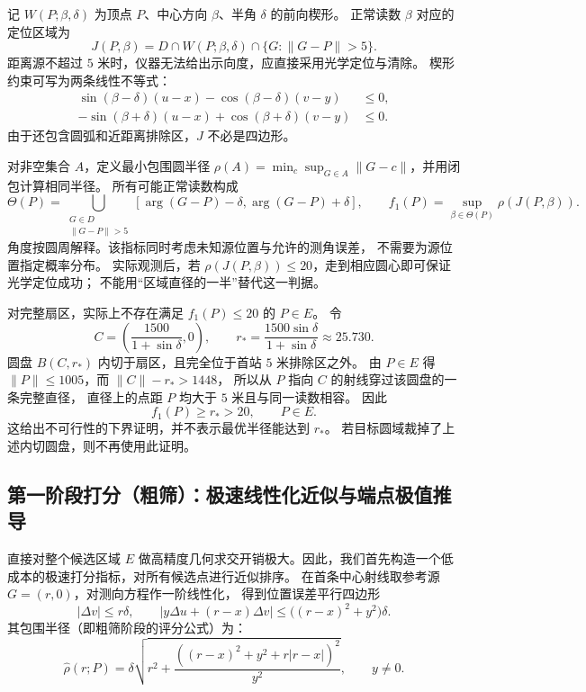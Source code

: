 记 $W(P;\beta,\delta)$ 为顶点 $P$、中心方向 $\beta$、半角 $\delta$ 的前向楔形。
正常读数 $\beta$ 对应的定位区域为
\begin{equation}
J(P,\beta)=D\cap W(P;\beta,\delta)\cap\{G:\|G-P\|>5\}.
\label{eq:q2J}
\end{equation}
距离源不超过 $5$ 米时，仪器无法给出示向度，应直接采用光学定位与清除。
楔形约束可写为两条线性不等式：
\begin{align}
\sin(\beta-\delta)(u-x)-\cos(\beta-\delta)(v-y)&\le0,\\
-\sin(\beta+\delta)(u-x)+\cos(\beta+\delta)(v-y)&\le0.
\end{align}
由于还包含圆弧和近距离排除区，$J$ 不必是四边形。

对非空集合 $A$，定义最小包围圆半径
$\rho(A)=\min_c\sup_{G\in A}\|G-c\|$，并用闭包计算相同半径。
所有可能正常读数构成
\begin{equation}
\Theta(P)=\bigcup_{\substack{G\in D\\\|G-P\|>5}}
[\arg(G-P)-\delta,\arg(G-P)+\delta],
\qquad
f_1(P)=\sup_{\beta\in\Theta(P)}\rho(J(P,\beta)).
\label{eq:q2score}
\end{equation}
角度按圆周解释。该指标同时考虑未知源位置与允许的测角误差，
不需要为源位置指定概率分布。
实际观测后，若 $\rho(J(P,\beta))\le20$，走到相应圆心即可保证光学定位成功；
不能用“区域直径的一半”替代这一判据。

对完整扇区，实际上不存在满足 $f_1(P)\le20$ 的 $P\in E$。
令
\begin{equation}
C=\left(\frac{1500}{1+\sin\delta},0\right),\qquad
r_*=\frac{1500\sin\delta}{1+\sin\delta}\approx25.730.
\end{equation}
圆盘 $B(C,r_*)$ 内切于扇区，且完全位于首站 $5$ 米排除区之外。
由 $P\in E$ 得 $\|P\|\le1005$，而 $\|C\|-r_*>1448$，
所以从 $P$ 指向 $C$ 的射线穿过该圆盘的一条完整直径，
直径上的点距 $P$ 均大于 $5$ 米且与同一读数相容。
因此
\begin{equation}
f_1(P)\ge r_*>20,\qquad P\in E.
\label{eq:q2impossible}
\end{equation}
这给出不可行性的下界证明，并不表示最优半径能达到 $r_*$。
若目标圆域裁掉了上述内切圆盘，则不再使用此证明。

\subsection{第一阶段打分（粗筛）：极速线性化近似与端点极值推导}

直接对整个候选区域 $E$ 做高精度几何求交开销极大。因此，我们首先构造一个低成本的极速打分指标，对所有候选点进行近似排序。
在首条中心射线取参考源 $G=(r,0)$，对测向方程作一阶线性化，
得到位置误差平行四边形
\begin{equation}
|\Delta v|\le r\delta,\qquad
|y\Delta u+(r-x)\Delta v|\le\bigl((r-x)^2+y^2\bigr)\delta .
\end{equation}
其包围半径（即粗筛阶段的评分公式）为：
\begin{equation}
\widehat\rho(r;P)=\delta
\sqrt{r^2+\frac{\left((r-x)^2+y^2+r|r-x|\right)^2}{y^2}},
\qquad y\ne0.
\label{eq:q2surrogate}
\end{equation}

